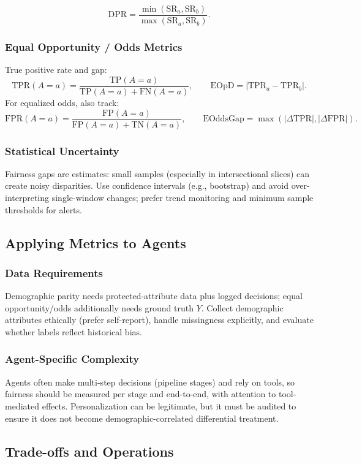 \begin{TNtwocol}
\[\text{DPR}=\frac{\min(\text{SR}_a,\text{SR}_b)}
{\max(\text{SR}_a,\text{SR}_b)}.
\]

\subsubsection*{Equal Opportunity / Odds Metrics}
True positive rate and gap:
\[
\text{TPR}(A=a)=\frac{\text{TP}(A=a)}
{\text{TP}(A=a)+\text{FN}(A=a)},
\qquad
\text{EOpD}=|\text{TPR}_a-\text{TPR}_b|.
\]
For equalized odds, also track:
\[
\text{FPR}(A=a)=\frac{\text{FP}(A=a)}
{\text{FP}(A=a)+\text{TN}(A=a)}, 
\qquad
\text{EOddsGap}=
\max(|\Delta\text{TPR}|,|\Delta\text{FPR}|).
\]

\subsubsection*{Statistical Uncertainty}
Fairness gaps are estimates: small samples (especially in intersectional slices) can create noisy disparities. Use confidence intervals (e.g., bootstrap) and avoid over-interpreting single-window changes; prefer trend monitoring and minimum sample thresholds for alerts.

\subsection*{Applying Metrics to Agents}

\subsubsection*{Data Requirements}
Demographic parity needs protected-attribute data plus logged decisions; equal opportunity/odds additionally needs ground truth $Y$. Collect demographic attributes ethically (prefer self-report), handle missingness explicitly, and evaluate whether labels reflect historical bias.

\subsubsection*{Agent-Specific Complexity}
Agents often make multi-step decisions (pipeline stages) and rely on tools, so fairness should be measured per stage and end-to-end, with attention to tool-mediated effects. Personalization can be legitimate, but it must be audited to ensure it does not become demographic-correlated differential treatment.

\subsection*{Trade-offs and Operations}


\end{TNtwocol}
